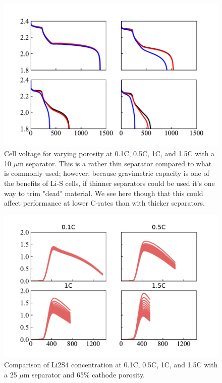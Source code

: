 \documentclass{elsarticle}
\begin{document}
\begin{figure}
    \centering
    \includegraphics[width=\textwidth]{Figures/Vcell_10um_sep.pdf}
    \caption{Cell voltage for varying porosity at 0.1C, 0.5C, 1C, and 1.5C with a 10 $\mu$m separator. This is a rather thin separator compared to what is commonly used; however, because gravimetric capacity is one of the benefits of Li-S cells, if thinner separators could be used it's one way to trim "dead" material. We see here though that this could affect performance at lower C-rates than with thicker separators.}
    \label{fig:porositystudy10umsep}
\end{figure}

\begin{figure}
    \centering
    \includegraphics[width=\textwidth]{Figures/Ck_Li2S4.pdf}
    \caption{Comparison of Li2S4 concentration at 0.1C, 0.5C, 1C, and 1.5C with a 25 $\mu$m separator and 65\% cathode porosity.}
    \label{fig:speciescomparisonLi2S4}
\end{figure}
\end{document}
